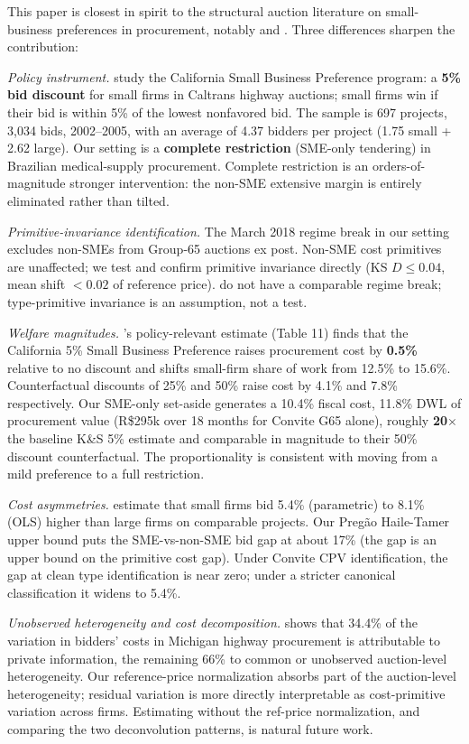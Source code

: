 This paper is closest in spirit to the structural auction literature on
small-business preferences in procurement, notably
\citet{krasnokutskayaseim2011} and \citet{krasnokutskaya2011}. Three
differences sharpen the contribution:

\textit{Policy instrument.}
\citet{krasnokutskayaseim2011} study the California Small Business
Preference program: a \textbf{5\% bid discount} for small firms in
Caltrans highway auctions; small firms win if their bid is within 5\%
of the lowest nonfavored bid. The sample is 697 projects, 3{,}034 bids,
2002--2005, with an average of 4.37 bidders per project (1.75 small
+ 2.62 large). Our setting is a \textbf{complete restriction}
(SME-only tendering) in Brazilian medical-supply procurement. Complete
restriction is an orders-of-magnitude stronger intervention: the
non-SME extensive margin is entirely eliminated rather than tilted.

\textit{Primitive-invariance identification.}
The March 2018 regime break in our setting excludes non-SMEs from
Group-65 auctions ex post. Non-SME cost primitives are unaffected;
we test and confirm primitive invariance directly
(KS $D \leq 0.04$, mean shift $< 0.02$ of reference price).
\citet{krasnokutskayaseim2011} do not have a comparable regime break;
type-primitive invariance is an assumption, not a test.

\textit{Welfare magnitudes.}
\citet{krasnokutskayaseim2011}'s policy-relevant estimate (Table 11)
finds that the California 5\% Small Business Preference raises
procurement cost by \textbf{0.5\%} relative to no discount and shifts
small-firm share of work from 12.5\% to 15.6\%. Counterfactual
discounts of 25\% and 50\% raise cost by 4.1\% and 7.8\% respectively.
Our SME-only set-aside generates a 10.4\% fiscal cost, 11.8\% DWL of
procurement value (R\$295k over 18 months for Convite G65 alone),
roughly \textbf{20$\times$} the baseline K\&S 5\% estimate and
comparable in magnitude to their 50\% discount counterfactual. The
proportionality is consistent with moving from a mild preference to
a full restriction.

\textit{Cost asymmetries.}
\citet{krasnokutskayaseim2011} estimate that small firms bid 5.4\%
(parametric) to 8.1\% (OLS) higher than large firms on comparable
projects. Our Preg\~ao Haile-Tamer upper bound puts the SME-vs-non-SME
bid gap at about 17\% (the gap is an upper bound on the primitive cost
gap). Under Convite CPV identification, the gap at clean type
identification is near zero; under a stricter canonical classification
it widens to 5.4\%.

\textit{Unobserved heterogeneity and cost decomposition.}
\citet{krasnokutskaya2011} shows that 34.4\% of the variation in
bidders' costs in Michigan highway procurement is attributable to
private information, the remaining 66\% to common or unobserved
auction-level heterogeneity. Our reference-price normalization absorbs
part of the auction-level heterogeneity; residual variation is more
directly interpretable as cost-primitive variation across firms.
Estimating without the ref-price normalization, and comparing the two
deconvolution patterns, is natural future work.

